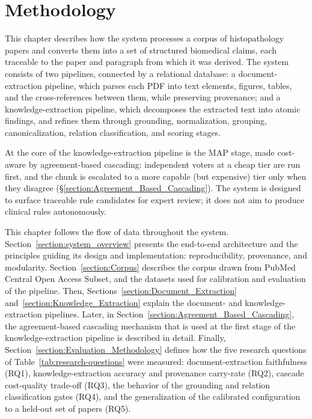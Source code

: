 
\chapter{Methodology}\label{chapter:Methodology}

This chapter describes how the system processes a corpus of histopathology papers and converts them into a set of structured biomedical claims, each traceable to the paper and paragraph from which it was derived. The system consists of two pipelines, connected by a relational database: a document-extraction pipeline, which parses each PDF into text elements, figures, tables, and the cross-references between them, while preserving provenance; and a knowledge-extraction pipeline, which decomposes the extracted text into atomic findings, and refines them through grounding, normalization, grouping, canonicalization, relation classification, and scoring stages. 

At the core of the knowledge-extraction pipeline is the MAP stage, made cost-aware by agreement-based cascading: independent voters at a cheap tier are run first, and the chunk is escalated to a more capable (but expensive) tier only when they disagree (§\ref{section:Agreement_Based_Cascading}). The system is designed to surface traceable rule candidates for expert review; it does not aim to produce clinical rules autonomously.

This chapter follows the flow of data throughout the system. Section~\ref{section:system_overview} presents the end-to-end architecture and the principles guiding its design and implementation: reproducibility, provenance, and modularity. Section~\ref{section:Corpus} describes the corpus drawn from PubMed Central Open Access Subset, and the datasets used for calibration and evaluation of the pipeline. Then, Sections~\ref{section:Document_Extraction} and~\ref{section:Knowledge_Extraction} explain the document- and knowledge-extraction pipelines. Later, in Section~\ref{section:Agreement_Based_Cascading}, the agreement-based cascading mechanism that is used at the first stage of the knowledge-extraction pipeline is described in detail. Finally, Section~\ref{section:Evaluation_Methodology} defines how the five research questions of Table~\ref{tab:research-questions} were measured: document-extraction faithfulness (RQ1), knowledge-extraction accuracy and provenance carry-rate (RQ2), cascade cost-quality trade-off (RQ3), the behavior of the grounding and relation classification gates (RQ4), and the generalization of the calibrated configuration to a held-out set of papers (RQ5).






